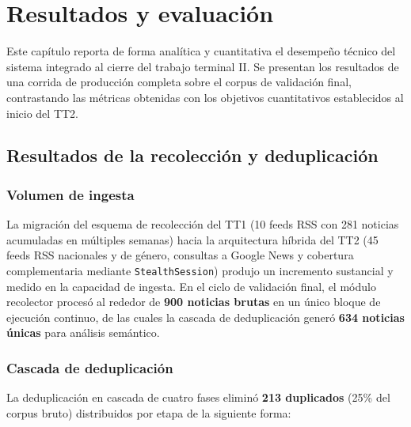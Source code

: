 

\chapter{Resultados y evaluación}
\label{cap:resultados}

Este capítulo reporta de forma analítica y cuantitativa el desempeño técnico del sistema
integrado al cierre del trabajo terminal II. Se presentan los resultados de una corrida de
producción completa sobre el corpus de validación final, contrastando las métricas obtenidas
con los objetivos cuantitativos establecidos al inicio del TT2.

\section{Resultados de la recolección y deduplicación}
\label{sec:res_recoleccion}

\subsection{Volumen de ingesta}
\label{subsec:res_volumen}

La migración del esquema de recolección del TT1 (10 feeds RSS con 281 noticias acumuladas
en múltiples semanas) hacia la arquitectura híbrida del TT2 (45 feeds RSS nacionales y de
género, consultas a Google News y cobertura complementaria mediante \texttt{StealthSession})
produjo un incremento sustancial y medido en la capacidad de ingesta. En el ciclo de validación
final, el módulo recolector procesó al rededor de \textbf{900 noticias brutas} en un único bloque de
ejecución continuo, de las cuales la cascada de deduplicación generó \textbf{634 noticias únicas}
para análisis semántico.

\subsection{Cascada de deduplicación}
\label{subsec:res_dedup}

La deduplicación en cascada de cuatro fases eliminó \textbf{213 duplicados} (25\% del
corpus bruto) distribuidos por etapa de la siguiente forma:

